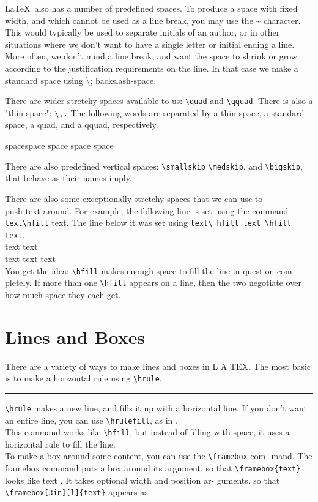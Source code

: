 \documentclass[12pt,A4]{article}
\begin{document}
	\LaTeX \ also has a number of predefined spaces. To produce a space with
	fixed width, and which cannot be used as a line break, you may use the \~{}
	character. This would typically be used to separate initials of an author,
	or in other situations where we don’t want to have a single letter or initial
	ending a line. More often, we don’t mind a line break, and want the space
	to shrink or grow according to the justification requirements on the line. In
	that case we make a standard space using \textbackslash \space ; backslash-space.
	
	There are wider stretchy spaces available to us: \texttt{\textbackslash quad} and \texttt{\textbackslash qquad}. There
	is also a "thin space": \texttt{\textbackslash ,.} The following words are separated by a thin space,
	a standard space, a quad, and a qquad, respectively.
	\begin{center}
		spacespace space \space space \space\space\space space
	\end{center}

	There are also predefined vertical spaces: \texttt{\textbackslash smallskip} \texttt{\textbackslash medskip}, and
	\texttt{\textbackslash bigskip}, that behave as their names imply.
	
	There are also some exceptionally stretchy spaces that we can use to \\
	push text around. For example, the following line is set using the command
	\texttt{text\textbackslash hfill} text. The line below it was set using \verb|text\ hfill text \hfill text|. \\
	text \hfill text \\ text \hfill text \hfill text \\
	You get the idea: \verb|\hfill| makes enough space to fill the line in question com-
	pletely. If more than one \verb|\hfill| appears on a line, then the two negotiate
	over how much space they each get.
	
	\section{Lines and Boxes}
	There are a variety of ways to make lines and boxes in L A TEX. The most
	basic is to make a horizontal rule using \verb|\hrule|.
	\hrule
	\verb|\hrule| makes a new line, and fills it up with a horizontal line. If you
	don’t want an entire line, you can use \verb|\hrulefill|, as in \hrulefill .\\
	This command works like \verb|\hfill|, but instead of filling with space, it uses a \\
	horizontal rule to fill the line.\\
	To make a box around some content, you can use the \verb|\framebox| com-
	mand. The framebox command puts a box around its argument, so that
	\verb|\framebox{text}| looks like text . It takes optional width and position ar-
	guments, so that \verb|\framebox[3in][l]{text}| appears as\\
	
\end{document}
